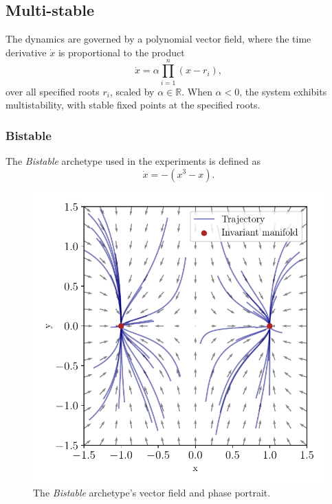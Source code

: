 \documentclass{article}
\theoremstyle{definition} \newtheorem{definition}{Definition}  \newtheorem{example}{Example}
\theoremstyle{remark} \newtheorem{remark}{Remark}
\newcounter{ct}
\newcommand{\field}[1]{\ensuremath{\mathbb{#1}}}
\newcommand{\reals}{\field{R}}
\begin{document}
\subsection{Multi-stable}\label{sec:multistable}
The dynamics are governed by a polynomial vector field, where the time derivative $\dot{x}$ is proportional to the product
\begin{equation}
\dot{x} = \alpha \prod_{i=1}^{n} (x - r_i),
\end{equation}
 over all specified roots $r_i$, scaled by $\alpha\in \reals$.
When $\alpha < 0$, the system exhibits multistability, with stable fixed points at the specified roots.

\subsubsection{Bistable}\label{sec:bistable}
The \emph{Bistable} archetype used in the experiments is defined as
\begin{equation}
\dot x = - (x^3 - x).
\end{equation}

\begin{figure}[htbp]
    \centering
    \includegraphics[width=.5\linewidth]{bistable_2d}
    \caption{The \emph{Bistable} archetype's vector field and phase portrait.
     }
    \label{fig:bistable_2d}
\end{figure}


%
%
\end{document}
